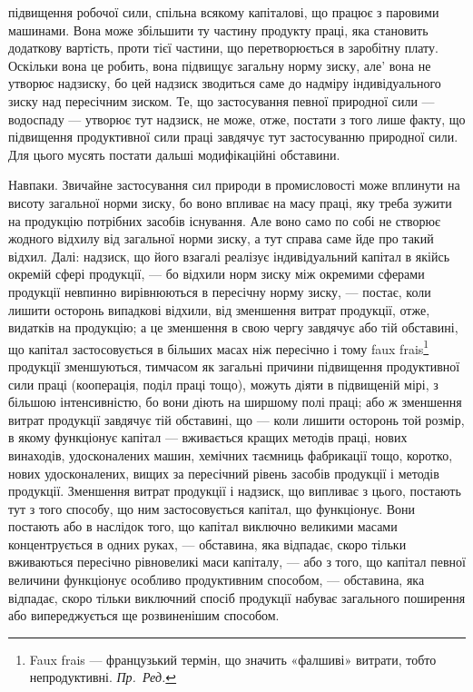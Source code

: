 \parcont{}  %
підвищення робочої сили, спільна всякому капіталові, що працює з паровими
машинами. Вона може збільшити ту частину продукту праці, яка становить
додаткову вартість, проти тієї частини, що перетворюється в заробітну плату.
Оскільки вона це робить, вона підвищує загальну норму зиску, але' вона не
утворює надзиску, бо цей надзиск зводиться саме до надміру індивідуального
зиску над пересічним зиском. Те, що застосування певної природної сили — водоспаду
— утворює тут надзиск, не може, отже, постати з того лише факту, що
підвищення продуктивної сили праці завдячує тут застосуванню природної сили.
Для цього мусять постати дальші модифікаційні обставини.

Навпаки. Звичайне застосування сил природи в промисловості може вплинути
на висоту загальної норми зиску, бо воно впливає на масу праці, яку
треба зужити на продукцію потрібних засобів існування. Але воно само по собі не
створює жодного відхилу від загальної норми зиску, а тут справа саме йде
про такий відхил. Далі: надзиск, що його взагалі реалізує індивідуальний капітал
в якійсь окремій сфері продукції, — бо відхили норм зиску між окремими сферами
продукції невпинно вирівнюються в пересічну норму зиску, — постає, коли лишити
осторонь випадкові відхили, від зменшення витрат продукції, отже, видатків на
продукцію; а це зменшення в свою чергу завдячує або тій обставині, що
капітал застосовується в більших масах ніж пересічно і тому faux frais\footnote*{
Faux frais — французький термін, що значить «фалшиві» витрати, тобто непродуктивні. \emph{Пр.~Ред.}
}
продукції зменшуються, тимчасом як загальні причини підвищення продуктивної
сили праці (кооперація, поділ праці тощо), можуть діяти в підвищеній мірі, з
більшою інтенсивністю, бо вони діють на ширшому полі праці; або ж зменшення
витрат продукції завдячує тій обставині, що — коли лишити осторонь той розмір,
в якому функціонує капітал — вживається кращих методів праці, нових винаходів,
удосконалених машин, хемічних таємниць фабрикації тощо, коротко, нових
удосконалених, вищих за пересічний рівень засобів продукції і методів продукції.
Зменшення витрат продукції і надзиск, що випливає з цього, постають тут
з того способу, що ним застосовується капітал, що функціонує. Вони постають
або в наслідок того, що капітал виключно великими масами концентрується в
одних руках, — обставина, яка відпадає, скоро тільки вживаються пересічно
рівновеликі маси капіталу, — або з того, що капітал певної величини функціонує
особливо продуктивним способом, — обставина, яка відпадає, скоро тільки
виключний спосіб продукції набуває загального поширення або випереджується
ще розвиненішим способом.


